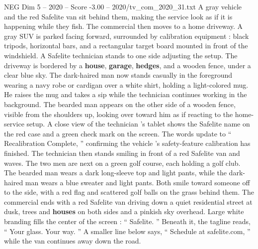 \begin{textsample}{NEG Dim 5 – 2020 – Score -3.00 – 2020/tv\_com\_2020\_31.txt}
A gray vehicle and the red Safelite van sit behind them, making the service look as if it is happening while they fish.
The commercial then moves to a home driveway.
A gray SUV is parked facing forward, surrounded by calibration equipment : black tripods, horizontal bars, and a rectangular target board mounted in front of the windshield.
A Safelite technician stands to one side adjusting the setup.
The driveway is bordered by a \textbf{house}, \textbf{garage}, \textbf{hedges}, and a wooden fence, under a clear blue sky.
The dark-haired man now stands casually in the foreground wearing a navy robe or cardigan over a white shirt, holding a light-colored mug.
He raises the mug and takes a sip while the technician continues working in the background.
The bearded man appears on the other side of a wooden fence, visible from the shoulders up, looking over toward him as if reacting to the home-service setup.
A close view of the technician ’s tablet shows the Safelite name on the red case and a green check mark on the screen.
The words update to “ Recalibration Complete, ” confirming the vehicle ’s safety-feature calibration has finished.
The technician then stands smiling in front of a red Safelite van and waves.
The two men are next on a green golf course, each holding a golf club.
The bearded man wears a dark long-sleeve top and light pants, while the dark-haired man wears a blue sweater and light pants.
Both smile toward someone off to the side, with a red flag and scattered golf balls on the grass behind them.
The commercial ends with a red Safelite van driving down a quiet residential street at dusk, trees and \textbf{houses} on both sides and a pinkish sky overhead.
Large white branding fills the center of the screen : “ Safelite. ” Beneath it, the tagline reads, “ Your glass.
Your way. ” A smaller line below says, “ Schedule at safelite.com, ” while the van continues away down the road.

\end{textsample}
